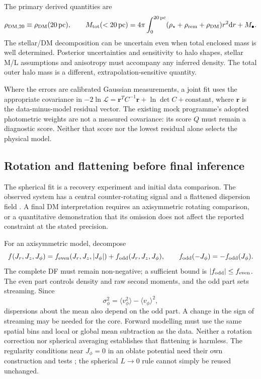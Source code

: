 \documentclass[11pt,a4paper]{article}
\newcommand{\dd}{\mathrm{d}}
\newcommand{\pc}{\,\mathrm{pc}}
\newcommand{\dm}{\mathrm{DM}}
\newcommand{\remn}{\mathrm{rem}}
\begin{document}
The primary derived quantities are
\begin{equation}
 \rho_{\dm,20}\equiv\rho_\dm(20\pc),\qquad
 M_{\rm tot}(<20\pc)=4\pi\int_0^{20\pc}
 (\rho_\star+\rho_\remn+\rho_\dm)r^2\dd r+M_\bullet.
\end{equation}
The stellar/DM decomposition can be uncertain even when total enclosed mass
is well determined. Posterior uncertainties and sensitivity to halo shapes,
stellar M/L assumptions and anisotropy must accompany any inferred density.
The total outer halo mass is a different, extrapolation-sensitive quantity.

Where the errors are calibrated Gaussian measurements, a joint fit uses the
appropriate covariance in $-2\ln\mathcal L=\boldsymbol r^T C^{-1}\boldsymbol r
+\ln\det C+\mathrm{constant}$, where $\boldsymbol r$ is the data-minus-model
residual vector. The existing mock programme's adopted photometric weights
are not a measured covariance: its score $Q$ must remain a diagnostic score.
Neither that score nor the lowest residual alone selects the physical model.

\subsection{Rotation and flattening before final inference}
\label{sec:rotation}

The spherical fit is a recovery experiment and initial data comparison.
The observed system has a central counter-rotating signal
\citep{2024MNRAS.528.4941P} and a flattened dispersion field
\citep{2025ApJ...983...95H}. A final DM interpretation requires an
axisymmetric rotating comparison, or a quantitative demonstration that its
omission does not affect the reported constraint at the stated precision.

For an axisymmetric model, decompose
\begin{equation}
 f(J_r,J_z,J_\phi)=f_{\rm even}(J_r,J_z,|J_\phi|)
                 +f_{\rm odd}(J_r,J_z,J_\phi),
 \qquad f_{\rm odd}(-J_\phi)=-f_{\rm odd}(J_\phi).
\end{equation}
The complete DF must remain non-negative; a sufficient bound is
$|f_{\rm odd}|\leq f_{\rm even}$. The even part controls density and raw
second moments, and the odd part sets streaming. Since
\begin{equation}
 \sigma_\phi^2=\langle v_\phi^2\rangle-\langle v_\phi\rangle^2,
\end{equation}
dispersions about the mean also depend on the odd part. A change in the
sign of streaming may be needed for the core. Forward modelling must use
the same spatial bins and local or global mean subtraction as the data.
Neither a rotation correction nor spherical averaging establishes that
flattening is harmless. The regularity conditions near $J_\phi=0$ in an
oblate potential need their own construction and tests
\citep{2026MNRAS.549ag854B}; the spherical $L\to0$ rule cannot simply be
reused unchanged.
\end{document}
